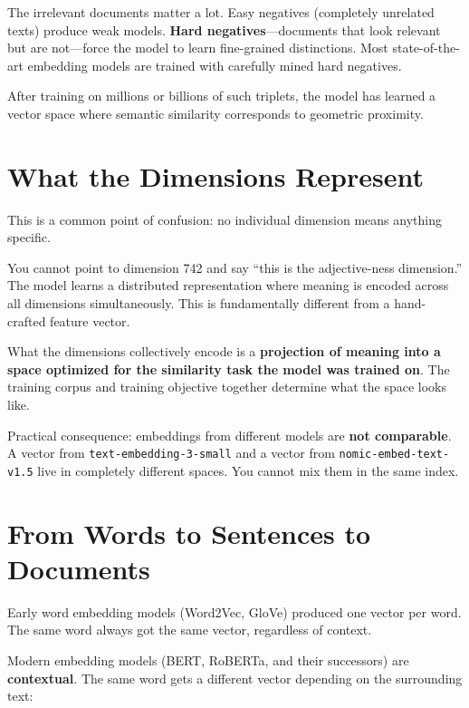 The irrelevant documents matter a lot. Easy negatives (completely unrelated texts) produce
weak models. \textbf{Hard negatives}---documents that look relevant but are not---force the
model to learn fine-grained distinctions. Most state-of-the-art embedding models are trained
with carefully mined hard negatives.

After training on millions or billions of such triplets, the model has learned a vector space
where semantic similarity corresponds to geometric proximity.

\section{What the Dimensions Represent}

This is a common point of confusion: no individual dimension means anything specific.

You cannot point to dimension 742 and say ``this is the adjective-ness dimension.'' The model
learns a distributed representation where meaning is encoded across all dimensions
simultaneously. This is fundamentally different from a hand-crafted feature vector.

What the dimensions collectively encode is a \textbf{projection of meaning into a space
optimized for the similarity task the model was trained on}. The training corpus and training
objective together determine what the space looks like.

Practical consequence: embeddings from different models are \textbf{not comparable}. A vector
from \texttt{text-embedding-3-small} and a vector from \texttt{nomic-embed-text-v1.5} live in
completely different spaces. You cannot mix them in the same index.

\section{From Words to Sentences to Documents}

Early word embedding models (Word2Vec, GloVe) produced one vector per word. The same word
always got the same vector, regardless of context.

Modern embedding models (BERT, RoBERTa, and their successors) are \textbf{contextual}. The
same word gets a different vector depending on the surrounding text:

